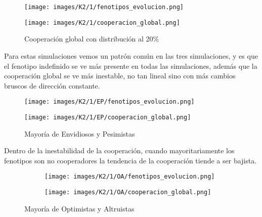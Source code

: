 \documentclass[a4paper,12pt]{report}
\begin{document}
\begin{figure}[h!]
    \centering
    \begin{minipage}{0.49\textwidth}
    \centering
    \texttt{[image: images/K2/1/fenotipos\_evolucion.png]}
    \label{fig:enter-label}
    \end{minipage}
    \hfill
    \begin{minipage}{0.49\textwidth}
    \centering
    \texttt{[image: images/K2/1/cooperacion\_global.png]}
    \label{fig:enter-label}
    \end{minipage}
    \caption{Cooperación global con distribución al 20\%}
\end{figure}
Para estas simulaciones vemos un patrón común en las tres simulaciones, y es que el fenotipo indefinido se ve más presente en todas las simulaciones, además que la cooperación global se ve más inestable, no tan lineal sino con más cambios bruscos de dirección constante.
\begin{figure}[h]
    \centering
    \begin{minipage}{0.49\textwidth}
    \centering
    \texttt{[image: images/K2/1/EP/fenotipos\_evolucion.png]}
    \label{fig:enter-label}
    \end{minipage}
    \hfill
    \begin{minipage}{0.49\textwidth}
    \centering
    \texttt{[image: images/K2/1/EP/cooperacion\_global.png]}
    \label{fig:enter-label}
    \end{minipage}
    \caption{Mayoría de Envidiosos y Pesimistas}
\end{figure}
Dentro de la inestabilidad de la cooperación, cuando mayoritariamente los fenotipos son no cooperadores la tendencia de la cooperación tiende a ser bajista.

\newpage

\begin{figure}[h!]
    \centering
    \begin{subfigure}[t]{0.49\textwidth}
        \centering
        \texttt{[image: images/K2/1/OA/fenotipos\_evolucion.png]}
        \label{fig:enter-label}
    \end{subfigure}
    \hfill
    \begin{subfigure}[t]{0.49\textwidth}
        \centering
        \texttt{[image: images/K2/1/OA/cooperacion\_global.png]}
        \label{fig:enter-label}
    \end{subfigure}
    \caption{Mayoría de Optimistas y Altruistas}
\end{figure}
\end{document}
